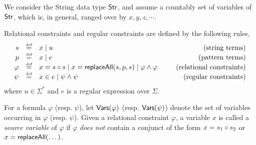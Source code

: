 
We consider the String data type ${\sf Str}$, and assume a countably set of variables of ${\sf Str}$, which is, in general, ranged over by $x, y, z, \cdots$.  




\begin{definition}
	Relational constraints and regular constraints are defined by the following rules,
	\[
	\begin{array}{r c l cr}
	s &\eqdef & x \mid u & \ \ & \mbox{(string terms)}\\
	p &\eqdef & x \mid e & \ \ & \mbox{(pattern terms)}\\
	\varphi &\eqdef & x = s \concat s  \mid  x = \replaceall(s, p, s) \mid \varphi \wedge \varphi & \ \ & \mbox{(relational constraints)}\\
	\psi & \eqdef & x \in e \mid \psi \wedge \psi %
	& \ \ & \mbox{(regular constraints)} \\
	\end{array}
	\]
	where $u \in \Sigma^\ast$ and $e$ is a regular expression over $\Sigma$. 
	
%	
\end{definition}


For a formula $\varphi$ (resp. $\psi$), let $\mathsf{Vars}(\varphi)$ (resp. $\mathsf{Vars}(\psi)$) denote the set of variables occurring in $\varphi$ (resp. $\psi$). Given a relational constraint $\varphi$, a variable $x$ is called a \emph{source variable} of $\varphi$ if $\varphi$ \emph{does not} contain a conjunct of the form $x = s_1 \circ s_2$ or $x = \mathsf{replaceAll}(\dots)$.

